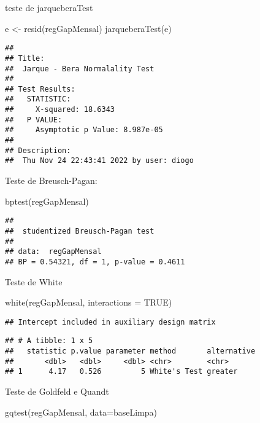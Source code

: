 \documentclass[
]{article}
\newenvironment{Shaded}{\begin{snugshade}}{\end{snugshade}}
\newcommand{\AttributeTok}[1]{\textcolor[rgb]{0.77,0.63,0.00}{#1}}
\newcommand{\ConstantTok}[1]{\textcolor[rgb]{0.00,0.00,0.00}{#1}}
\newcommand{\FunctionTok}[1]{\textcolor[rgb]{0.00,0.00,0.00}{#1}}
\newcommand{\NormalTok}[1]{#1}
\newcommand{\OtherTok}[1]{\textcolor[rgb]{0.56,0.35,0.01}{#1}}
\begin{document}
teste de jarqueberaTest

\begin{Shaded}
\begin{Highlighting}[]
\NormalTok{e }\OtherTok{\textless{}{-}} \FunctionTok{resid}\NormalTok{(regGapMensal)}
\FunctionTok{jarqueberaTest}\NormalTok{(e)}
\end{Highlighting}
\end{Shaded}

\begin{verbatim}
## 
## Title:
##  Jarque - Bera Normalality Test
## 
## Test Results:
##   STATISTIC:
##     X-squared: 18.6343
##   P VALUE:
##     Asymptotic p Value: 8.987e-05 
## 
## Description:
##  Thu Nov 24 22:43:41 2022 by user: diogo
\end{verbatim}

Teste de Breusch-Pagan:

\begin{Shaded}
\begin{Highlighting}[]
\FunctionTok{bptest}\NormalTok{(regGapMensal)}
\end{Highlighting}
\end{Shaded}

\begin{verbatim}
## 
##  studentized Breusch-Pagan test
## 
## data:  regGapMensal
## BP = 0.54321, df = 1, p-value = 0.4611
\end{verbatim}

Teste de White

\begin{Shaded}
\begin{Highlighting}[]
\FunctionTok{white}\NormalTok{(regGapMensal, }\AttributeTok{interactions =} \ConstantTok{TRUE}\NormalTok{)}
\end{Highlighting}
\end{Shaded}

\begin{verbatim}
## Intercept included in auxiliary design matrix
\end{verbatim}

\begin{verbatim}
## # A tibble: 1 x 5
##   statistic p.value parameter method       alternative
##       <dbl>   <dbl>     <dbl> <chr>        <chr>      
## 1      4.17   0.526         5 White's Test greater
\end{verbatim}

Teste de Goldfeld e Quandt

\begin{Shaded}
\begin{Highlighting}[]
\FunctionTok{gqtest}\NormalTok{(regGapMensal, }\AttributeTok{data=}\NormalTok{baseLimpa)}
\end{Highlighting}
\end{Shaded}
\end{document}
